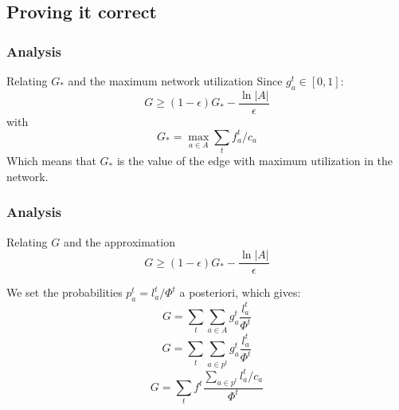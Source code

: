\documentclass{beamer}
\begin{document}
\subsection{Proving it correct}
\begin{frame}
    \frametitle{Analysis}

    \begin{block}{Relating $G_*$ and the maximum network utilization}
        Since $g_a^t \in [0,1]$:
        \begin{equation*}
            G \geq (1 - \epsilon) G_* - \dfrac{\ln |A|}{\epsilon}
        \end{equation*}
        with
        \begin{equation*}
            G_* = \max_{a\in A} \sum_t f^t_a / c_a
        \end{equation*}
        Which means that $G_*$ is the value of the edge with maximum
        utilization in the network.
    \end{block}

\end{frame}

\begin{frame}
    \frametitle{Analysis}

    \begin{block}{Relating $G$ and the approximation}
        \begin{equation*}
            G \geq (1 - \epsilon) G_* - \dfrac{\ln |A|}{\epsilon}
        \end{equation*}

        We set the probabilities $p_a^t = l_a^t / \Phi^t$ a posteriori, which
        gives:
        \begin{equation*}
            G = \sum_t \sum_{a\in A} g_a^t \frac{l_a^t}{\Phi^t}
        \end{equation*}
        \begin{equation*}
            G = \sum_t \sum_{a\in p^t} g_a^t \frac{l_a^t}{\Phi^t}
        \end{equation*}
        \begin{equation*}
            G = \sum_t f^t \frac{\sum_{a\in p^t} l_a^t / c_a}{\Phi^t}
        \end{equation*}
    \end{block}

\end{frame}
\end{document}
